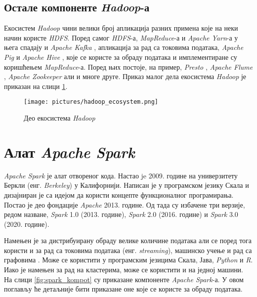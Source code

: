 \documentclass[12pt,oneside]{memoir}
\begin{document}
\section{Остале компоненте \textit{Hadoop}-а}
\label{sec:ostale_komp_hadupa}

Екосистем \textit{Hadoop} чини велики број апликација разних примена које на неки начин користе \textit{HDFS}. Поред самог \textit{HDFS}-а, \textit{MapReduce}-а и \textit{Apache Yarn}-а у њега спадају и \textit{Apache Kafka} \cite{apache_kafka}, апликација за рад са токовима података, \textit{Apache Pig} \cite{apache_pig} и \textit{Apache Hive} \cite{apache_hive}, које се користе за обраду података и имплементиране су коришћењем \textit{MapReduce}-а. Поред њих постоје, на пример,  \textit{Presto} \cite{presto}, \textit{Apache Flume} \cite{apache_flume}, \textit{Apache Zookeeper} \cite{apache_zookeeper} али и многе друге. Приказ малог дела екосистема \textit{Hadoop} је приказан на слици \ref{fig:hadoop_ecosystem}.

\begin{figure}[!ht]
  \centering
  \texttt{[image: pictures/hadoop\_ecosystem.png]}
  \caption{Део екосистема \textit{Hadoop}}
  \label{fig:hadoop_ecosystem}
\end{figure}

\chapter{Алат \textit{Apache Spark}}
\label{chp:spark}


\textit{Apache Spark} је алат отвореног кода. Настао je 2009. године на универзитету Беркли (енг. \textit{Berkeley}) у Калифорнији. Написан је у програмском језику Скала и дизајниран је са идејом да користи концепте функционалног програмирања. Постао је део фондације \textit{Apache} 2013. године. Од тада су избачене три верзије, редом назване, \textit{Spark} 1.0 (2013. године), \textit{Spark} 2.0 (2016. године) и \textit{Spark} 3.0 (2020. године).

Намењен је за дистрибуирану обраду велике количине података али се поред тога користи и за рад са токовима података (енг. \textit{streaming}), машинско учење и рад са графовима \cite{spark_guide}. Може се користити у програмским језицима Скала, Јава, \textit{Python} и \textit{R}. Иако је намењен за рад на кластерима, може се користити и на једној машини. На слици \ref{fig:spark_kompot} су приказане компоненте \textit{Apache Spark}-а. У овом поглављу ће детаљније бити приказане оне које се користе за обраду података.
\end{document}
